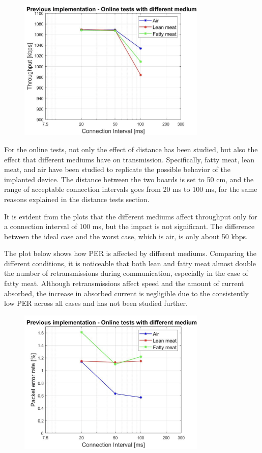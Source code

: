\documentclass{Configuration_Files/PoliMi3i_thesis}
\begin{document}
\begin{figure}[h!]
    \centering
    \includegraphics[width=0.8\textwidth]{Results Manuel/figure7}
    \label{fig:figure1}
\end{figure}

For the online tests, not only the effect of distance has been studied, but also the effect that different mediums have on transmission. Specifically, fatty meat, lean meat, and air have been studied to replicate the possible behavior of the implanted device. The distance between the two boards is set to 50 cm, and the range of acceptable connection intervals goes from 20 ms to 100 ms, for the same reasons explained in the distance tests section.

It is evident from the plots that the different mediums affect throughput only for a connection interval of 100 ms, but the impact is not significant. The difference between the ideal case and the worst case, which is air, is only about 50 kbps.

The plot below shows how PER is affected by different mediums. Comparing the different conditions, it is noticeable that both lean and fatty meat almost double the number of retransmissions during communication, especially in the case of fatty meat. Although retransmissions affect speed and the amount of current absorbed, the increase in absorbed current is negligible due to the consistently low PER across all cases and has not been studied further.

\begin{figure}[h!]
    \centering
    \includegraphics[width=0.8\textwidth]{Results Manuel/figure8}
    \label{fig:figure1}
\end{figure}
\end{document}
